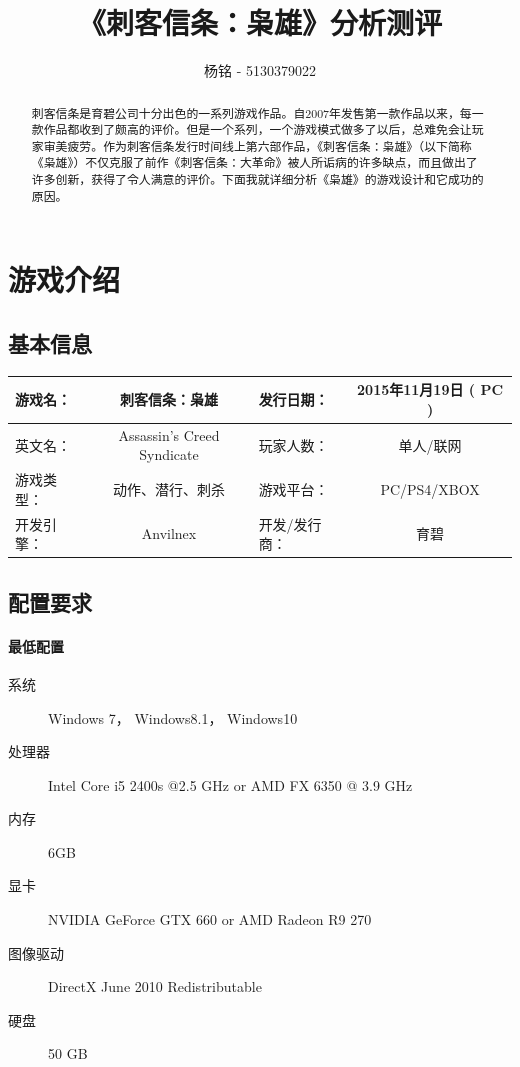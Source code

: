 \documentclass{article} \usepackage{CJK}
\author{杨铭 - 5130379022}
\title{《刺客信条：枭雄》分析测评}
\begin{document}
\maketitle
\tableofcontents
\newpage
\begin{abstract}
刺客信条是育碧公司十分出色的一系列游戏作品。自2007年发售第一款作品以来，每一款作品都收到了颇高的评价。但是一个系列，一个游戏模式做多了以后，总难免会让玩家审美疲劳。作为刺客信条发行时间线上第六部作品，《刺客信条：枭雄》（以下简称《枭雄》）不仅克服了前作《刺客信条：大革命》被人所诟病的许多缺点，而且做出了许多创新，获得了令人满意的评价。下面我就详细分析《枭雄》的游戏设计和它成功的原因。
\end{abstract}
\section{游戏介绍}
\subsection{基本信息}
\begin{table}[!hb]
\centering
\begin{tabular}{lc|lc}
  \hline
  游戏名： & 刺客信条：枭雄 & 发行日期： & 2015年11月19日 ( PC )\\\hline
  英文名： & Assassin's Creed Syndicate & 玩家人数： & 单人/联网\\\hline
  游戏类型：& 动作、潜行、刺杀 & 游戏平台： & PC/PS4/XBOX\\\hline
  开发引擎：& Anvilnex & 开发/发行商：& 育碧\\
  \hline
\end{tabular}
\end{table}
\subsection{配置要求}
    \paragraph{最低配置}
    \begin{description}
      \item[系统] Windows 7， Windows8.1， Windows10
      \item[处理器] Intel Core i5 2400s @2.5 GHz or AMD FX 6350 @ 3.9 GHz
      \item[内存] 6GB
      \item[显卡] NVIDIA GeForce GTX 660 or AMD Radeon R9 270
      \item[图像驱动] DirectX June 2010 Redistributable
      \item[硬盘] 50 GB
    \end{description}
\end{document}

